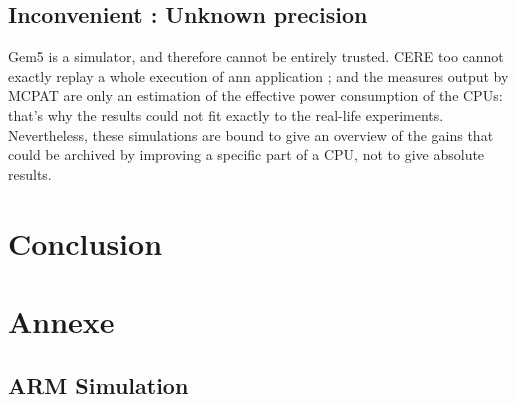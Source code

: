 \documentclass{article}
\begin{document}
\begin{multicols}{2}
\subsection{Inconvenient : Unknown precision}
Gem5 is a simulator, and therefore cannot be entirely trusted. CERE too cannot exactly replay a whole execution of ann application ; and the measures output by MCPAT are only an estimation of the effective power consumption of the CPUs: that's why the results could not fit exactly to the real-life experiments. Nevertheless, these simulations are bound to give an overview of the gains that could be archived by improving a specific part of a CPU, not to give absolute results.

\label{results}

\section{Conclusion}
\label{ccl}

\newpage





\newpage
\section{Annexe}
\subsection{ARM Simulation}

\end{multicols}
\end{document}
